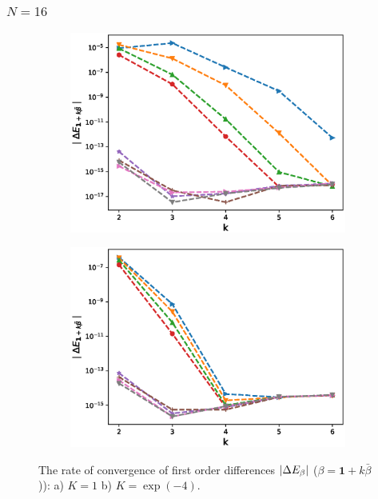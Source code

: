 \documentclass[11pt]{article}
\begin{document}
\newpage
\subsubsection*{$N=16$ }


\begin{figure}[h!]
\centering
\begin{subfigure}{.5\textwidth}
\centering
\includegraphics[width=1\linewidth]{./figures/mixed_diff_second_way/H_043/N_16/first_difference_rbergomi_16steps_H_043_K_1.eps}
\caption{}
\label{fig:sub3}
\end{subfigure}%
\begin{subfigure}{.5\textwidth}
\centering
\includegraphics[width=1\linewidth]{./figures/mixed_diff_second_way/H_043/N_16/first_difference_rbergomi_16steps_H_043_K_exp__4.eps}
\caption{}
\label{fig:sub4}
\end{subfigure}

\caption{The rate of convergence of  first order differences $\left\lvert\Delta E_{\beta}\right\rvert$ ($\beta=\mathbf{1}+k \bar{\beta}$)): a) $K=1$ b)  $K=\operatorname{exp}(-4).$}
\label{fig:test2}
\end{figure}
\end{document}

